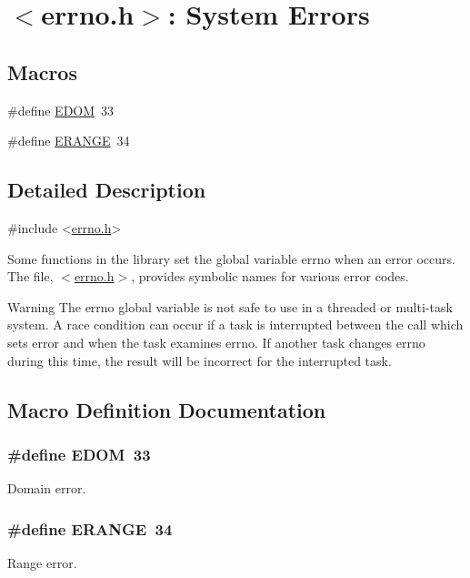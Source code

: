 \hypertarget{group__avr__errno}{}\section{$<$errno.\+h$>$\+: System Errors}
\label{group__avr__errno}
\subsection*{Macros}
\begin{DoxyCompactItemize}
\item 
\#define \hyperlink{group__avr__errno_ga5fe247e079b591a68e0fdbf7caec5b70}{E\+D\+OM}~33
\item 
\#define \hyperlink{group__avr__errno_gaa1591a4f3a86360108de5b9ba34980ca}{E\+R\+A\+N\+GE}~34
\end{DoxyCompactItemize}


\subsection{Detailed Description}

\begin{DoxyCode}
\textcolor{preprocessor}{#include <\hyperlink{errno_8h}{errno.h}>}
\end{DoxyCode}


Some functions in the library set the global variable {\ttfamily errno} when an error occurs. The file, {\ttfamily $<$\hyperlink{errno_8h}{errno.\+h}$>$}, provides symbolic names for various error codes.

\begin{DoxyWarning}{Warning}
The {\ttfamily errno} global variable is not safe to use in a threaded or multi-\/task system. A race condition can occur if a task is interrupted between the call which sets {\ttfamily error} and when the task examines {\ttfamily errno}. If another task changes {\ttfamily errno} during this time, the result will be incorrect for the interrupted task. 
\end{DoxyWarning}


\subsection{Macro Definition Documentation}
\subsubsection[{\texorpdfstring{E\+D\+OM}{EDOM}}]{\setlength{\rightskip}{0pt plus 5cm}\#define E\+D\+OM~33}\hypertarget{group__avr__errno_ga5fe247e079b591a68e0fdbf7caec5b70}{}\label{group__avr__errno_ga5fe247e079b591a68e0fdbf7caec5b70}
Domain error. 
\subsubsection[{\texorpdfstring{E\+R\+A\+N\+GE}{ERANGE}}]{\setlength{\rightskip}{0pt plus 5cm}\#define E\+R\+A\+N\+GE~34}\hypertarget{group__avr__errno_gaa1591a4f3a86360108de5b9ba34980ca}{}\label{group__avr__errno_gaa1591a4f3a86360108de5b9ba34980ca}
Range error. 